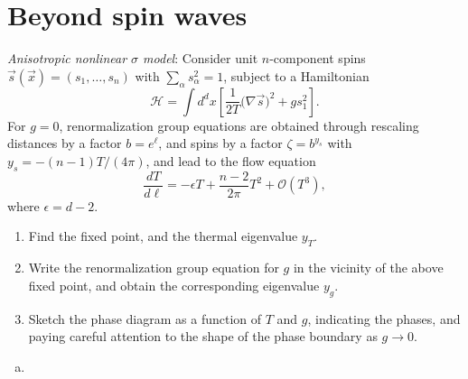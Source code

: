 \chapter{Beyond spin waves}

\begin{problem}
    \textit{Anisotropic nonlinear $\sigma$ model}: Consider unit $n$-component spins $\vec{s}(\vec{x}) = (s_1, \ldots, s_n)$ with $\sum_\alpha s_\alpha^2 = 1$, subject to a Hamiltonian
    \[
        \mathcal{H} = \int d^dx\left[\frac{1}{2T}\bigl(\nabla\vec{s}\bigr)^2 + g s_1^2\right].
    \]
    For $g = 0$, renormalization group equations are obtained through rescaling distances by a factor $b = e^\ell$, and spins by a factor $\zeta = b^{y_s}$ with $y_s = -(n-1)T/(4\pi)$, and lead to the flow equation
    \[
        \frac{dT}{d\ell} = -\epsilon T + \frac{n-2}{2\pi}T^2 + \mathcal{O}(T^3),
    \]
    where $\epsilon = d - 2$.

    \begin{enumerate}
        \item[(a)] Find the fixed point, and the thermal eigenvalue $y_T$.

        \item[(b)] Write the renormalization group equation for $g$ in the vicinity of the above fixed point, and obtain the corresponding eigenvalue $y_g$.

        \item[(c)] Sketch the phase diagram as a function of $T$ and $g$, indicating the phases, and paying careful attention to the shape of the phase boundary as $g \to 0$.
    \end{enumerate}
\end{problem}

\begin{solution}
    \begin{enumerate}[(a)]
        \item
    \end{enumerate}
\end{solution}

